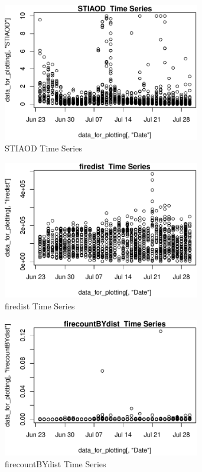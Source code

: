 \begin{figure} 
\centering  
\includegraphics[width=0.77\textwidth]{Code_Outputs/ML_input_report_AllforCaret_cleaned_StepPractice_part_practice_STIAODTS.pdf} 
\caption{\label{fig:ML_input_report_AllforCaret_cleaned_StepPractice_part_practiceSTIAODTS}STIAOD  Time Series} 
\end{figure} 
 

\begin{figure} 
\centering  
\includegraphics[width=0.77\textwidth]{Code_Outputs/ML_input_report_AllforCaret_cleaned_StepPractice_part_practice_firedistTS.pdf} 
\caption{\label{fig:ML_input_report_AllforCaret_cleaned_StepPractice_part_practicefiredistTS}firedist  Time Series} 
\end{figure} 
 

\begin{figure} 
\centering  
\includegraphics[width=0.77\textwidth]{Code_Outputs/ML_input_report_AllforCaret_cleaned_StepPractice_part_practice_firecountBYdistTS.pdf} 
\caption{\label{fig:ML_input_report_AllforCaret_cleaned_StepPractice_part_practicefirecountBYdistTS}firecountBYdist  Time Series} 
\end{figure} 
 

